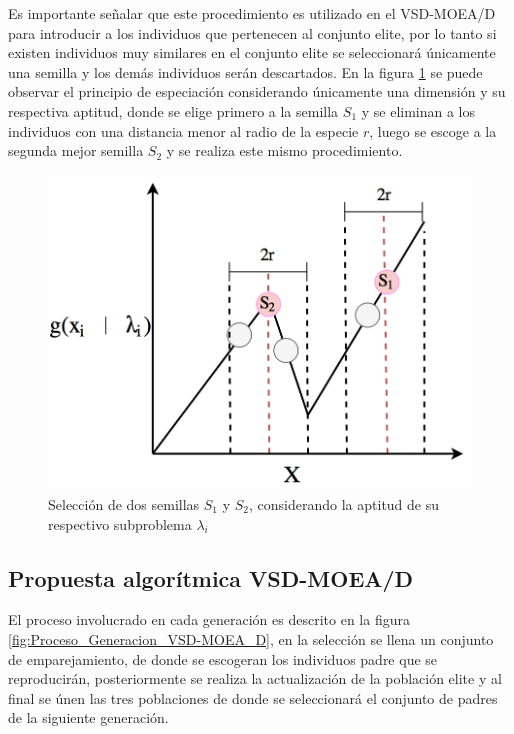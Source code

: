 Es importante señalar que este procedimiento es utilizado en el VSD-MOEA/D para introducir a los individuos que pertenecen al conjunto elite, por lo tanto si existen individuos muy similares en el conjunto elite se seleccionará únicamente una semilla y los demás individuos serán descartados.
%
En la figura \ref{fig:Especiation} se puede observar el principio de especiación considerando únicamente una dimensión y su respectiva aptitud, donde se elige primero a la semilla $S_1$ y se eliminan a los individuos con una distancia menor al radio de la especie $r$, luego se escoge a la segunda mejor semilla $S_2$ y se realiza este mismo procedimiento. 
\begin{figure}[H]
\centering
\scriptsize
\includegraphics[scale=0.2]
{Figures_Chapter4/Especiacion.png}
\decoRule
\caption{Selección de dos semillas $S_1$ y $S_2$, considerando la aptitud de su respectivo subproblema $\lambda_i$}
\label{fig:Especiation}
\end{figure}


%
\subsection{Propuesta algorítmica VSD-MOEA/D}

El proceso involucrado en cada generación es descrito en la figura \ref{fig:Proceso_Generacion_VSD-MOEA_D}, en la selección se llena un conjunto de emparejamiento, de donde se escogeran los individuos padre que se reproducirán, posteriormente se realiza la actualización de la población elite y al final se únen las tres poblaciones de donde se seleccionará el conjunto de padres de la siguiente generación.

